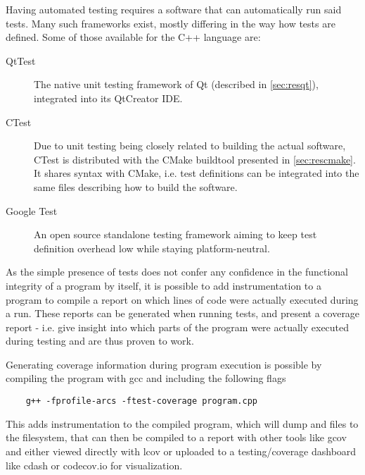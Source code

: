 Having automated testing requires a software that can automatically run said tests. Many such frameworks exist, mostly differing in the way how tests are defined. Some of those available for the C++ language are:
\begin{description}
	\item[QtTest] The native unit testing framework of Qt (described in \ref{sec:resqt}), integrated into its QtCreator IDE.
	\item[CTest] Due to unit testing being closely related to building the actual software, CTest is distributed with the CMake buildtool presented in \ref{sec:rescmake}. It shares syntax with CMake, i.e. test definitions can be integrated into the same files describing how to build the software.
	\item[Google Test]  An open source standalone testing framework aiming to keep test definition overhead low while staying platform-neutral.
\end{description}

As the simple presence of tests does not confer any confidence in the functional integrity of a program by itself, it is possible to add instrumentation to a program to compile a report on which lines of code were actually executed during a run. These reports can be generated when running tests, and present a \gls{coverage} report - i.e. give insight into which parts of the program were actually executed during testing and are thus proven to work.

Generating coverage information during program execution is possible by compiling the program with gcc and including the following flags
\begin{lstlisting}
	g++ -fprofile-arcs -ftest-coverage program.cpp
\end{lstlisting}

This adds instrumentation to the compiled program, which will dump  and  files to the filesystem, that can then be compiled to a report with other tools like gcov and either viewed directly with lcov or uploaded to a testing/coverage dashboard like cdash or codecov.io for visualization.

